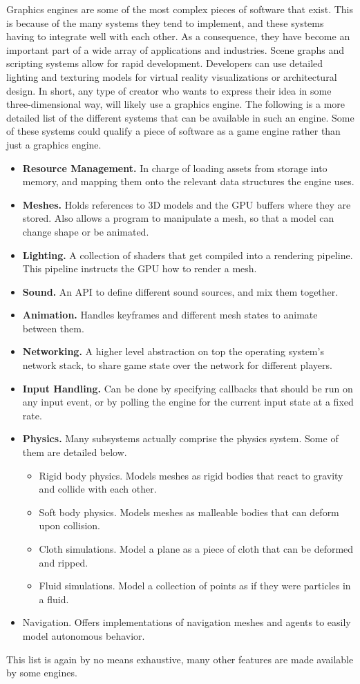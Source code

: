 Graphics engines are some of the most complex pieces of software that exist.
This is because of the many systems they tend to implement,
and these systems having to integrate well with each other.
As a consequence,
they have become an important part of a wide array of applications and industries.
Scene graphs and scripting systems allow for rapid development.
Developers can use detailed lighting and texturing models for virtual reality visualizations or architectural design.
In short,
any type of creator who wants to express their idea in some three-dimensional way,
will likely use a graphics engine.
The following is a more detailed list of the different systems that can be available in such an engine.
Some of these systems could qualify a piece of software as a game engine rather than just a graphics engine.

\begin{itemize}
\item \textbf{Resource Management.}
  In charge of loading assets from storage into memory,
  and mapping them onto the relevant data structures the engine uses.
\item \textbf{Meshes.}
  Holds references to 3D models and the GPU buffers where they are stored.
  Also allows a program to manipulate a mesh,
  so that a model can change shape or be animated.
\item \textbf{Lighting.}
  A collection of shaders that get compiled into a rendering pipeline.
  This pipeline instructs the GPU how to render a mesh.
\item \textbf{Sound.}
  An API to define different sound sources, and mix them together.
\item \textbf{Animation.}
  Handles keyframes and different mesh states to animate between them.
\item \textbf{Networking.}
  A higher level abstraction on top the operating system's network stack,
  to share game state over the network for different players.
\item \textbf{Input Handling.}
  Can be done by specifying callbacks that should be run on any input event,
  or by polling the engine for the current input state at a fixed rate.
\item \textbf{Physics.}
  Many subsystems actually comprise the physics system.
  Some of them are detailed below.
  \begin{itemize}
  \item {Rigid body physics.}
    Models meshes as rigid bodies that react to gravity and collide with each other.
  \item {Soft body physics.}
    Models meshes as malleable bodies that can deform upon collision.
  \item {Cloth simulations.}
    Model a plane as a piece of cloth that can be deformed and ripped.
  \item {Fluid simulations.}
    Model a collection of points as if they were particles in a fluid.
  \end{itemize}
\item {Navigation.}
  Offers implementations of navigation meshes and agents to easily model autonomous behavior.
\end{itemize}

This list is again by no means exhaustive,
many other features are made available by some engines.

